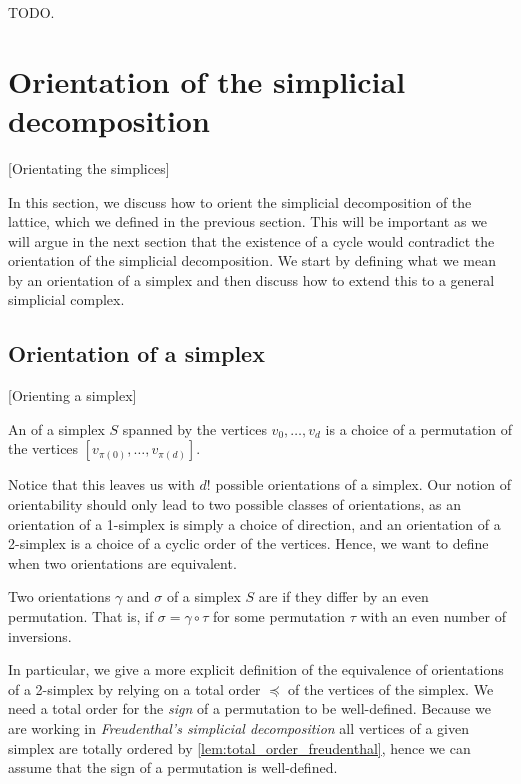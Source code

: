 TODO\@.

\section{Orientation of the simplicial decomposition}[Orientating the simplices]

In this section, we discuss how to orient the simplicial decomposition of the lattice, which we defined in the previous section. This will be important as we will argue in the next section that the existence of a cycle would contradict the orientation of the simplicial decomposition. We start by defining what we mean by an orientation of a simplex and then discuss how to extend this to a general simplicial complex.

\subsection{Orientation of a simplex}[Orienting a simplex]\label{sec:orientation_of_simplex}

\begin{definition}
	An  of a simplex $S$ spanned by the vertices $v_0, \dots, v_d$ is a choice of a permutation of the vertices $[v_{\pi(0)}, \dots, v_{\pi(d)}]$.
\end{definition}

Notice that this leaves us with ${d!}$ possible orientations of a simplex. Our notion of orientability should only lead to two possible classes of orientations, as an orientation of a 1-simplex is simply a choice of direction, and an orientation of a 2-simplex is a choice of a cyclic order of the vertices. Hence, we want to define when two orientations are equivalent.

\begin{definition}
	Two orientations $\gamma$ and $\sigma$ of a simplex $S$ are  if they differ by an even permutation. That is, if $\sigma = \gamma \circ \tau$ for some permutation $\tau$ with an even number of inversions.
\end{definition}

In particular, we give a more explicit definition of the equivalence of orientations of a 2-simplex by relying on a total order $\preceq$ of the vertices of the simplex. We need a total order for the \emph{sign} of a permutation to be well-defined. Because we are working in \emph{Freudenthal's simplicial decomposition} all vertices of a given simplex are totally ordered by \cref{lem:total_order_freudenthal}, hence we can assume that the sign of a permutation is well-defined.

